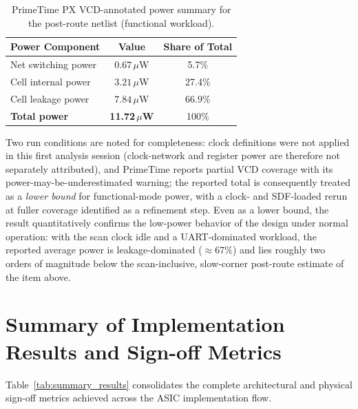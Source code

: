 \documentclass[11pt,a4paper]{article}
\begin{document}
\begin{table}[htbp]
\centering
\caption{PrimeTime PX VCD-annotated power summary for the post-route netlist (functional workload).}
\label{tab:px_power}
\renewcommand{\arraystretch}{1.2}
\begin{tabularx}{\textwidth}{|Y|c|c|}
\hline
\textbf{Power Component} & \textbf{Value} & \textbf{Share of Total} \\
\hline
Net switching power & $0.67\,\mu$W & 5.7\% \\
\hline
Cell internal power & $3.21\,\mu$W & 27.4\% \\
\hline
Cell leakage power & $7.84\,\mu$W & 66.9\% \\
\hline
\textbf{Total power} & \textbf{11.72\,$\mu$W} & 100\% \\
\hline
\end{tabularx}
\end{table}

Two run conditions are noted for completeness: clock definitions were not applied in this first analysis session (clock-network and register power are therefore not separately attributed), and PrimeTime reports partial VCD coverage with its power-may-be-underestimated warning; the reported total is consequently treated as a \emph{lower bound} for functional-mode power, with a clock- and SDF-loaded rerun at fuller coverage identified as a refinement step. Even as a lower bound, the result quantitatively confirms the low-power behavior of the design under normal operation: with the scan clock idle and a UART-dominated workload, the reported average power is leakage-dominated ($\approx 67\%$) and lies roughly two orders of magnitude below the scan-inclusive, slow-corner post-route estimate of the item above.

\section{Summary of Implementation Results and Sign-off Metrics}

Table~\ref{tab:summary_results} consolidates the complete architectural and physical sign-off metrics achieved across the ASIC implementation flow.
\end{document}
